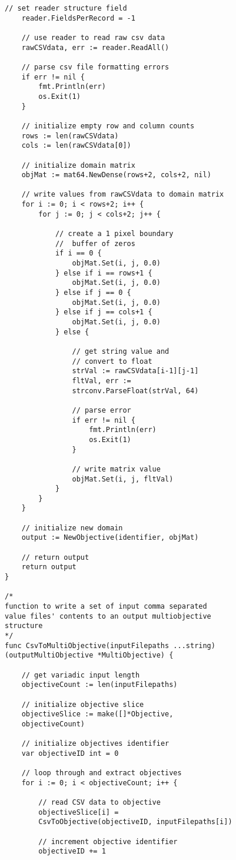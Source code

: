 \begin{lstlisting}[basicstyle=\small]
	// set reader structure field
	reader.FieldsPerRecord = -1

	// use reader to read raw csv data
	rawCSVdata, err := reader.ReadAll()

	// parse csv file formatting errors
	if err != nil {
		fmt.Println(err)
		os.Exit(1)
	}

	// initialize empty row and column counts
	rows := len(rawCSVdata)
	cols := len(rawCSVdata[0])

	// initialize domain matrix
	objMat := mat64.NewDense(rows+2, cols+2, nil)

	// write values from rawCSVdata to domain matrix
	for i := 0; i < rows+2; i++ {
		for j := 0; j < cols+2; j++ {

			// create a 1 pixel boundary 
			//  buffer of zeros
			if i == 0 {
				objMat.Set(i, j, 0.0)
			} else if i == rows+1 {
				objMat.Set(i, j, 0.0)
			} else if j == 0 {
				objMat.Set(i, j, 0.0)
			} else if j == cols+1 {
				objMat.Set(i, j, 0.0)
			} else {

				// get string value and  
				// convert to float
				strVal := rawCSVdata[i-1][j-1]
				fltVal, err := 
				strconv.ParseFloat(strVal, 64)

				// parse error
				if err != nil {
					fmt.Println(err)
					os.Exit(1)
				}

				// write matrix value
				objMat.Set(i, j, fltVal)
			}
		}
	}

	// initialize new domain
	output := NewObjective(identifier, objMat)

	// return output
	return output
}

/* 
function to write a set of input comma separated 
value files' contents to an output multiobjective 
structure
*/
func CsvToMultiObjective(inputFilepaths ...string) 
(outputMultiObjective *MultiObjective) {

	// get variadic input length
	objectiveCount := len(inputFilepaths)

	// initialize objective slice
	objectiveSlice := make([]*Objective, 
	objectiveCount)

	// initialize objectives identifier
	var objectiveID int = 0

	// loop through and extract objectives
	for i := 0; i < objectiveCount; i++ {

		// read CSV data to objective
		objectiveSlice[i] = 
		CsvToObjective(objectiveID, inputFilepaths[i])

		// increment objective identifier
		objectiveID += 1


\end{lstlisting}
